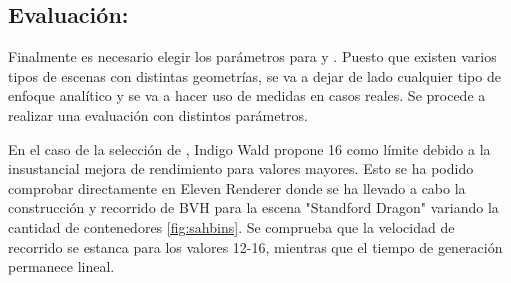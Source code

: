 \subsection{Evaluación:}
	
Finalmente es necesario elegir los parámetros para  y . Puesto que existen varios tipos de escenas con distintas geometrías, se va a dejar de lado cualquier tipo de enfoque analítico y se va a hacer uso de medidas en casos reales. Se procede a realizar una evaluación con distintos parámetros.
	
En el caso de la selección de , Indigo Wald propone 16 como límite \cite{wald2007fast} debido a la insustancial mejora de rendimiento para valores mayores. Esto se ha podido comprobar directamente en Eleven Renderer donde se ha llevado a cabo la construcción y recorrido de BVH para la escena "Standford Dragon" variando la cantidad de contenedores \autoref{fig:sahbins}. Se comprueba que la velocidad de recorrido se estanca para los valores 12-16, mientras que el tiempo de generación permanece lineal.

\begin{figure}[H]
	\label{fig:sahbins}
\centering
{}
\end{figure}